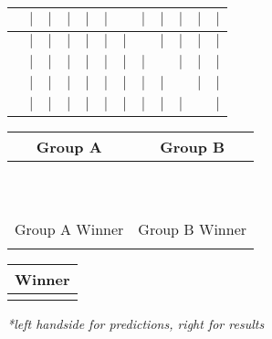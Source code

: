 \documentclass[landscape]{article}
\begin{document}
\begin{tabular}{|c|c|c|c|c|c|c|c|c|c|c|c|}
    \hline
    & $|$ & $|$ & $|$ & $|$ & $|$ & \cellcolor{black} & $|$ & $|$ & $|$ & $|$ & \cellcolor{blue} $|$ \\
    \hline
    & $|$ & $|$ & $|$ & $|$ & $|$ & $|$ & \cellcolor{black} & $|$ & $|$ & $|$ & \cellcolor{blue} $|$ \\
    \hline
    & $|$ & $|$ & $|$ & $|$ & $|$ & $|$ & $|$ & \cellcolor{black} & $|$ & $|$ & \cellcolor{blue} $|$ \\
    \hline
    & $|$ & $|$ & $|$ & $|$ & $|$ & $|$ & $|$ & $|$ & \cellcolor{black} & $|$ & \cellcolor{blue} $|$ \\
    \hline
    & $|$ & $|$ & $|$ & $|$ & $|$ & $|$ & $|$ & $|$ & $|$ & \cellcolor{black} & \cellcolor{blue} $|$ \\
    \hline
\end{tabular}

\vspace{10pt}
\begin{tabular}{|c|c|c|c|c|c|c|c|}
  \hline
  \multicolumn{4}{|c|}{\cellcolor{red} Group A} & \multicolumn{4}{|c|}{\cellcolor{blue} Group B} \\
  \hline
  & & & & & & & \\
  \hline
  & & & & & & & \\
  \hline
  & & & & & & & \\
  \hline
  & & & & & & & \\
  \hline
  & & & & & & & \\
  \hline
  & & & & & & & \\
  \hline
  & & & & & & & \\
  \hline
  & & & & & & & \\
  \hline
  & & & & & & & \\
  \hline
  & & & & & & & \\
  \hline\hline
  \multicolumn{4}{|c|}{\cellcolor{magenta} Group A Winner} &  \multicolumn{4}{|c|}{\cellcolor{cyan} Group B Winner} \\
  \hline
  \multicolumn{2}{|c|}{} & \multicolumn{2}{|c|}{} & \multicolumn{2}{|c|}{} & \multicolumn{2}{|c|}{} \\
  \hline
\end{tabular}

\vspace{10pt}
\begin{tabular}{|c|c|}
  \hline
  \multicolumn{2}{|c|}{\cellcolor{orange} Winner} \\
  \hline
  & \\
  \hline
\end{tabular}

\vspace{10pt}
\textit{*left handside for predictions, right for results}
\end{document}
